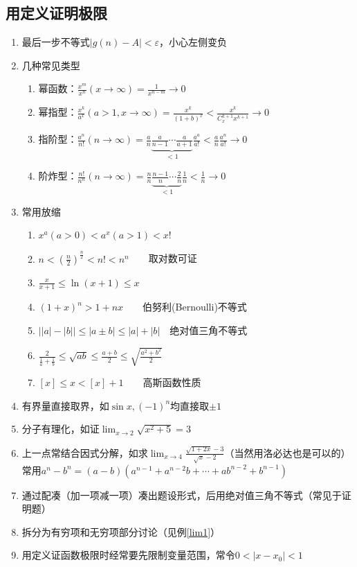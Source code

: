 \subsection{用定义证明极限}
\label{sec:2.3def_pf_limit}
\begin{enumerate}
	\item 最后一步不等式$|g(n)-A|<\varepsilon$，小心左侧变负
	\item 几种常见类型
	\begin{enumerate}
		\item 幂函数：$\displaystyle\frac{x^m}{x^n}(x\to\infty)=\frac{1}{x^{n-m}}\to 0$
		\item 幂指型：$\displaystyle\frac{x^k}{a^x}(a>1,x\to\infty)=\frac{x^k}{(1+b)^x}<\frac{x^k}{C_x^{k+1}x^{k+1}}\to 0$
		\item 指阶型：$\displaystyle\frac{a^n}{n!}(n\to\infty)=\frac{a}{n}\underbrace{\frac{a}{n-1}\cdots\frac{a}{a+1}}_{<1}\frac{a^a}{a!}<\frac{a}{n}\frac{a^n}{a!}\to 0$
		\item 阶炸型：$\displaystyle\frac{n!}{n^n}(n\to\infty)=\frac{n}{n}\underbrace{\frac{n-1}{n}\cdots\frac{2}{n}}_{<1}\frac{1}{n}<\frac{1}{n}\to 0$
	\end{enumerate}
	\item 常用放缩
	\begin{enumerate}
		\item $x^a(a>0)<a^x(a>1)<x!$
		\item $\displaystyle n<(\frac{n}{2})^{\frac{n}{2}}<n!<n^n\qquad$取对数可证
		\item $\displaystyle \frac{x}{x+1}\leq\ln(x+1)\leq x$
		\item $\displaystyle (1+x)^n>1+nx\qquad$伯努利(Bernoulli)不等式
		\item $\Big||a|-|b|\Big|\leq|a\pm b|\leq|a|+|b|\quad$绝对值三角不等式
		\item $\displaystyle \frac{2}{\frac{1}{a}+\frac{1}{b}}\leq\sqrt{ab}\leq\frac{a+b}{2}\leq\sqrt{\frac{a^2+b^2}{2}}$
		\item $[x]\leq x<[x]+1\qquad$高斯函数性质
	\end{enumerate}
	\item 有界量直接取界，如$\sin x,(-1)^n$均直接取$\pm 1$
	\item 分子有理化，如证$\displaystyle\lim_{x\to 2}\sqrt{x^2+5}=3$
	\item 上一点常结合因式分解，如求$\displaystyle\lim_{x\to 4}\frac{\sqrt{1+2x}-3}{\sqrt{x}-2}$（当然用洛必达也是可以的）\\
		常用$a^n-b^n=(a-b)(a^{n-1}+a^{n-2}b+\cdots+ab^{n-2}+b^{n-1})$
	\item 通过配凑（加一项减一项）凑出题设形式，后用绝对值三角不等式（常见于证明题）
	\item 拆分为有穷项和无穷项部分讨论（见例\ref{lim1}）
	\item 用定义证函数极限时经常要先限制变量范围，常令$0<|x-x_0|<1$
\end{enumerate}
